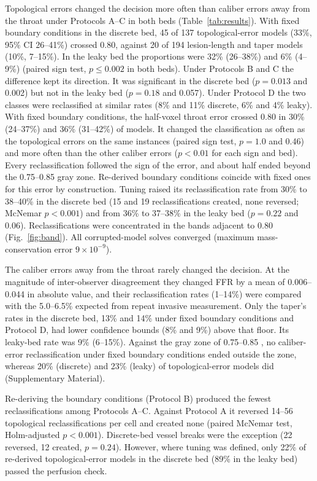 \documentclass[journal,twoside,web]{ieeecolor}
\begin{document}
Topological errors changed the decision more often than caliber errors away from the throat under Protocols A--C in both beds
(Table~\ref{tab:results}). With fixed boundary conditions in the discrete bed, 45 of 137 topological-error models
(33\%, 95\% CI 26--41\%) crossed 0.80, against 20 of 194 lesion-length and taper models (10\%, 7--15\%). In the leaky bed the
proportions were 32\% (26--38\%) and 6\% (4--9\%) (paired sign test, $p \leq 0.002$ in both beds). Under
Protocols B and C the difference kept its direction. It was significant in the discrete bed
($p = 0.013$ and 0.002) but not in the leaky bed ($p = 0.18$ and 0.057). Under Protocol D the two classes
were reclassified at similar rates (8\% and 11\% discrete, 6\% and 4\% leaky). With fixed boundary conditions, the half-voxel throat error crossed 0.80 in 30\% (24--37\%) and 36\% (31--42\%) of models. It changed the classification as often as the topological errors on the same instances (paired sign test, $p = 1.0$ and 0.46) and more often than the other caliber errors ($p < 0.01$ for each sign and bed). Every reclassification followed the sign of the error, and about half ended beyond the 0.75--0.85 gray zone. Re-derived boundary conditions coincide with fixed ones for this error by construction. Tuning raised its reclassification rate from 30\% to 38--40\% in the discrete bed (15 and 19 reclassifications created, none reversed; McNemar $p < 0.001$) and from 36\% to 37--38\% in the leaky bed ($p = 0.22$ and 0.06). Reclassifications were concentrated in the bands adjacent to 0.80 (Fig.~\ref{fig:band}). All corrupted-model solves converged (maximum mass-conservation error $9\times10^{-9}$).

The caliber errors away from the throat rarely changed the decision. At the magnitude of inter-observer disagreement they changed FFR by
a mean of 0.006--0.044 in absolute value, and their reclassification rates (1--14\%) were compared with the 5.0--6.5\% expected from repeat invasive measurement. Only the taper's rates in the discrete bed, 13\% and 14\% under fixed boundary conditions and Protocol D, had lower confidence bounds (8\% and 9\%) above that floor. Its leaky-bed rate was 9\% (6--15\%). Against the gray zone of 0.75--0.85 \cite{petraco2013}, no caliber-error reclassification under fixed boundary conditions
ended outside the zone, whereas 20\% (discrete) and 23\% (leaky) of topological-error models did (Supplementary Material).

Re-deriving the boundary conditions (Protocol B) produced the fewest reclassifications among Protocols A--C. Against Protocol A it reversed 14--56
topological reclassifications per cell and created none (paired McNemar test, Holm-adjusted $p < 0.001$). Discrete-bed vessel
breaks were the exception (22 reversed, 12 created, $p = 0.24$). However, where tuning was defined, only 22\% of re-derived topological-error models in the discrete bed (89\% in the leaky bed) passed the perfusion check.
\end{document}
